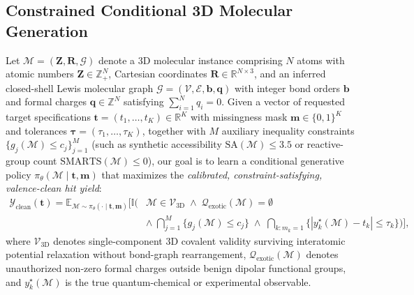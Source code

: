 \documentclass[11pt,a4paper]{article}
\begin{document}
\subsection{Constrained Conditional 3D Molecular Generation}
Let $\mathcal{M} = (\mathbf{Z}, \mathbf{R}, \mathcal{G})$ denote a 3D molecular instance comprising $N$ atoms with atomic numbers $\mathbf{Z} \in \mathbb{Z}_+^N$, Cartesian coordinates $\mathbf{R} \in \mathbb{R}^{N \times 3}$, and an inferred closed-shell Lewis molecular graph $\mathcal{G} = (\mathcal{V}, \mathcal{E}, \mathbf{b}, \mathbf{q})$ with integer bond orders $\mathbf{b}$ and formal charges $\mathbf{q} \in \mathbb{Z}^N$ satisfying $\sum_{i=1}^N q_i = 0$. Given a vector of requested target specifications $\mathbf{t} = (t_1, \dots, t_K) \in \mathbb{R}^K$ with missingness mask $\mathbf{m} \in \{0,1\}^K$ and tolerances $\boldsymbol{\tau} = (\tau_1, \dots, \tau_K)$, together with $M$ auxiliary inequality constraints $\{g_j(\mathcal{M}) \le c_j\}_{j=1}^M$ (such as synthetic accessibility $\text{SA}(\mathcal{M}) \le 3.5$ or reactive-group count $\text{SMARTS}(\mathcal{M}) \le 0$), our goal is to learn a conditional generative policy $\pi_\theta(\mathcal{M} \mid \mathbf{t}, \mathbf{m})$ that maximizes the \emph{calibrated, constraint-satisfying, valence-clean hit yield}:
\begin{equation}
\label{eq:problem}
\begin{aligned}
\mathcal{Y}_{\text{clean}}(\mathbf{t}) = \mathbb{E}_{\mathcal{M} \sim \pi_\theta(\cdot \mid \mathbf{t}, \mathbf{m})} \!\Bigg[ \mathbb{I}\!\Bigg(
&\mathcal{M} \in \mathcal{V}_{\text{3D}} \;\land\; \mathcal{Q}_{\text{exotic}}(\mathcal{M}) = \emptyset \\
&\land\; \bigcap_{j=1}^M \{g_j(\mathcal{M}) \le c_j\} \;\land\; \bigcap_{k: m_k=1} \big\{|y_k^\star(\mathcal{M}) - t_k| \le \tau_k\big\}
\Bigg) \Bigg],
\end{aligned}
\end{equation}
where $\mathcal{V}_{\text{3D}}$ denotes single-component 3D covalent validity surviving interatomic potential relaxation without bond-graph rearrangement, $\mathcal{Q}_{\text{exotic}}(\mathcal{M})$ denotes unauthorized non-zero formal charges outside benign dipolar functional groups, and $y_k^\star(\mathcal{M})$ is the true quantum-chemical or experimental observable.
\end{document}
